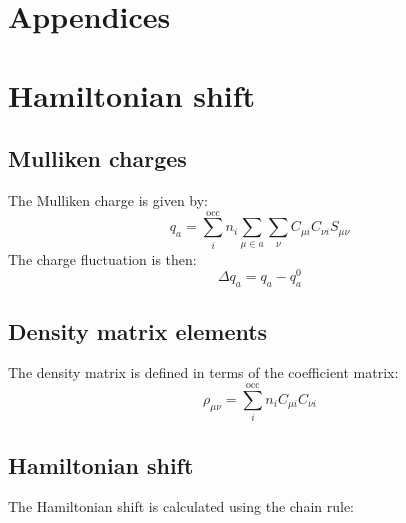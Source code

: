 \documentclass{article}
\numberwithin{equation}{section}
\begin{document}


\clearpage
\section*{Appendices}
\appendix
\section{Hamiltonian shift}

\subsection{Mulliken charges}
The Mulliken charge is given by:
\begin{equation}
    q_a = \sum_i^\mathrm{occ} n_i \sum_{\mu \in a} \sum_{\nu}
    C_{\mu i} C_{\nu i} S_{\mu\nu}
\end{equation}
The charge fluctuation is then: 
\begin{equation}
    \Delta q_a = q_a - q_a^0
\end{equation}

\subsection{Density matrix elements}
The density matrix is defined in terms of the coefficient matrix:
\begin{equation}
    \rho_{\mu\nu} = \sum_i^\mathrm{occ} n_i C_{\mu i} C_{\nu i}
\end{equation}

\subsection{Hamiltonian shift}
The Hamiltonian shift is calculated using the chain rule:
\end{document}
